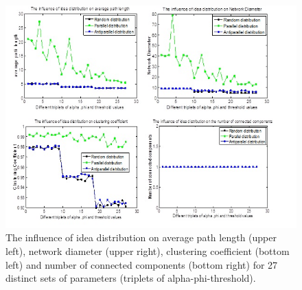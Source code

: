 \begin{figure}
[htp]
\begin{center}
\includegraphics{Fig9}
\end{center}
\caption{The influence of idea distribution on average path length (upper left), network diameter (upper right), clustering coefficient (bottom left) and number of connected components (bottom right) for 27 distinct sets of parameters (triplets of alpha-phi-threshold). }
\label {fig9}
\end{figure}

